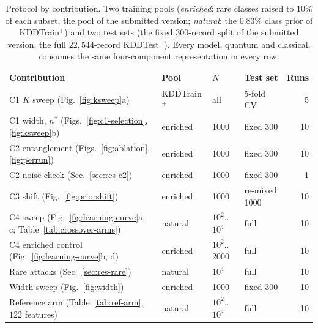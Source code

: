 \begin{table}[t]
\centering
\caption{Protocol by contribution. Two training pools (\emph{enriched}: rare
classes raised to $10\%$ of each subset, the pool of the submitted version;
\emph{natural}: the $0.83\%$ class prior of KDDTrain$^+$) and two test sets
(the fixed $300$-record split of the submitted version; the full $22{,}544$-record
KDDTest$^+$). Every model, quantum and classical, consumes the same
four-component representation in every row.}
\label{tab:protocol}
\scriptsize
\setlength{\tabcolsep}{2.5pt}
\begin{tabular}{@{}l l l l r@{}}
\toprule
Contribution & Pool & $N$ & Test set & Runs \\
\midrule
C1 $K$ sweep (Fig.~\ref{fig:ksweep}a) & KDDTrain$^+$ & all & 5-fold CV & 5 \\
C1 width, $n^\ast$ (Figs.~\ref{fig:c1-selection}, \ref{fig:ksweep}b) & enriched & 1000 & fixed 300 & 10 \\
C2 entanglement (Figs.~\ref{fig:ablation}, \ref{fig:perrun}) & enriched & 1000 & fixed 300 & 10 \\
C2 noise check (Sec.~\ref{sec:res-c2}) & enriched & 1000 & fixed 300 & 1 \\
C3 shift (Fig.~\ref{fig:priorshift}) & enriched & 1000 & re-mixed 1000 & 10 \\
C4 sweep (Fig.~\ref{fig:learning-curve}a, c; Table~\ref{tab:crossover-arms}) & natural & $10^2$..$10^4$ & full & 10 \\
C4 enriched control (Fig.~\ref{fig:learning-curve}b, d) & enriched & $10^2$..$2000$ & full & 10 \\
Rare attacks (Sec.~\ref{sec:res-rare}) & natural & $10^4$ & full & 10 \\
Width sweep (Fig.~\ref{fig:width}) & enriched & 1000 & fixed 300 & 10 \\
Reference arm (Table~\ref{tab:ref-arm}, $122$ features) & natural & $10^2$..$10^4$ & full & 10 \\
\bottomrule
\end{tabular}
\end{table}

